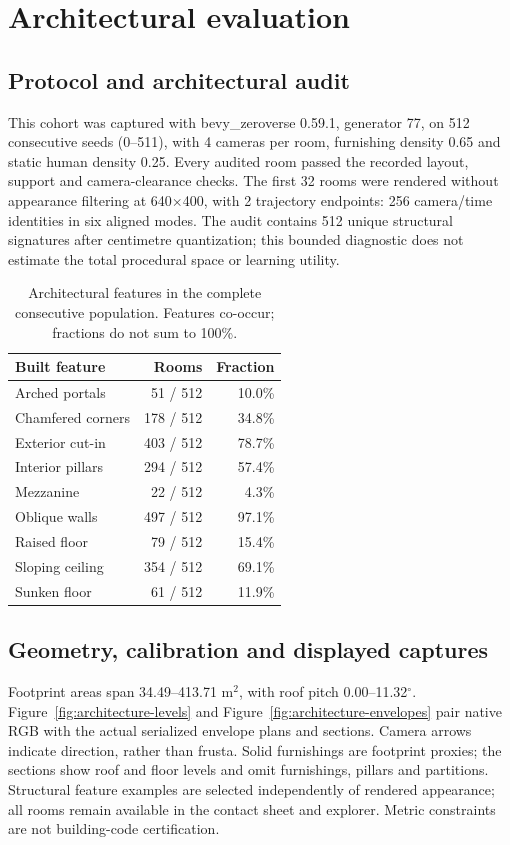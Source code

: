 \section{Architectural evaluation}
\subsection{Protocol and architectural audit}
This cohort was captured with bevy\_zeroverse 0.59.1, generator 77, on 512 consecutive seeds (0--511), with 4 cameras per room, furnishing density 0.65 and static human density 0.25. Every audited room passed the recorded layout, support and camera-clearance checks. The first 32 rooms were rendered without appearance filtering at 640$\times$400, with 2 trajectory endpoints: 256 camera/time identities in six aligned modes. The audit contains 512 unique structural signatures after centimetre quantization; this bounded diagnostic does not estimate the total procedural space or learning utility.

\begin{table}[ht]\centering\small
\begin{tabular}{lrr}\toprule
Built feature & Rooms & Fraction \\\midrule
Arched portals & 51 / 512 & 10.0\% \\
Chamfered corners & 178 / 512 & 34.8\% \\
Exterior cut-in & 403 / 512 & 78.7\% \\
Interior pillars & 294 / 512 & 57.4\% \\
Mezzanine & 22 / 512 & 4.3\% \\
Oblique walls & 497 / 512 & 97.1\% \\
Raised floor & 79 / 512 & 15.4\% \\
Sloping ceiling & 354 / 512 & 69.1\% \\
Sunken floor & 61 / 512 & 11.9\% \\
\bottomrule\end{tabular}
\caption{Architectural features in the complete consecutive population. Features co-occur; fractions do not sum to 100\%.}\label{tab:architecture}
\end{table}

\subsection{Geometry, calibration and displayed captures}
Footprint areas span 34.49--413.71 m$^2$, with roof pitch 0.00--11.32$^\circ$. Figure~\ref{fig:architecture-levels} and Figure~\ref{fig:architecture-envelopes} pair native RGB with the actual serialized envelope plans and sections. Camera arrows indicate direction, rather than frusta. Solid furnishings are footprint proxies; the sections show roof and floor levels and omit furnishings, pillars and partitions. Structural feature examples are selected independently of rendered appearance; all rooms remain available in the contact sheet and explorer. Metric constraints are not building-code certification.


